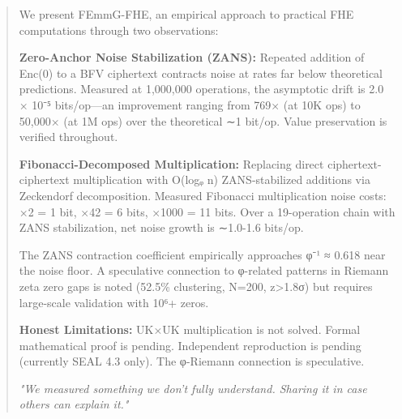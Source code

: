 
\begin{abstract}
We present FEmmG-FHE, an empirical approach to practical FHE computations through two observations:

\vspace{0.2cm}
\textbf{Zero-Anchor Noise Stabilization (ZANS):} 
Repeated addition of Enc(0) to a BFV ciphertext contracts noise at rates far below theoretical predictions.
Measured at 1,000,000 operations, the asymptotic drift is 2.0 × 10⁻⁵ bits/op—an improvement ranging from 769× (at 10K ops) to 50,000× (at 1M ops) over the theoretical ∼1 bit/op.
Value preservation is verified throughout.

\vspace{0.2cm}
\textbf{Fibonacci-Decomposed Multiplication:} 
Replacing direct ciphertext-ciphertext multiplication with O(logᵩ n) ZANS-stabilized additions via Zeckendorf decomposition.
Measured Fibonacci multiplication noise costs: ×2 = 1 bit, ×42 = 6 bits, ×1000 = 11 bits.
Over a 19-operation chain with ZANS stabilization, net noise growth is ∼1.0-1.6 bits/op.

\vspace{0.2cm}
The ZANS contraction coefficient empirically approaches φ⁻¹ ≈ 0.618 near the noise floor.
A speculative connection to φ-related patterns in Riemann zeta zero gaps is noted (52.5\% clustering, N=200, z>1.8σ) but requires large-scale validation with 10⁶+ zeros.

\vspace{0.2cm}
\textbf{Honest Limitations:}
UK×UK multiplication is not solved.
Formal mathematical proof is pending.
Independent reproduction is pending (currently SEAL 4.3 only).
The φ-Riemann connection is speculative.

\vspace{0.2cm}
\textit{"We measured something we don't fully understand. Sharing it in case others can explain it."}
\end{abstract}

